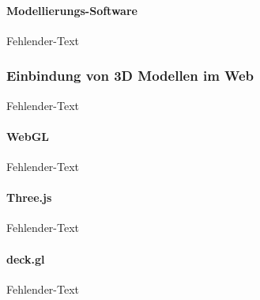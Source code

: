 \paragraph{Modellierungs-Software}
Fehlender-Text


\subsubsection{Einbindung von 3D Modellen im Web}
Fehlender-Text

\paragraph{WebGL}
Fehlender-Text

\paragraph{Three.js}
Fehlender-Text

\paragraph{deck.gl}
Fehlender-Text